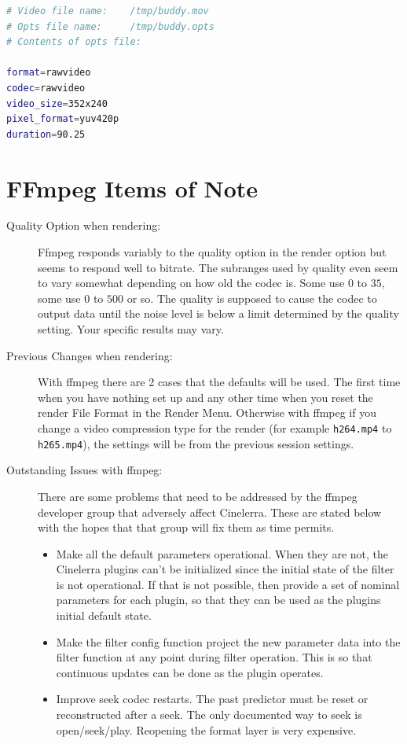 \begin{lstlisting}[language=bash]
# Video file name:    /tmp/buddy.mov
# Opts file name:     /tmp/buddy.opts
# Contents of opts file:

format=rawvideo
codec=rawvideo
video_size=352x240
pixel_format=yuv420p
duration=90.25
\end{lstlisting}

\section{FFmpeg Items of Note}%
\label{sec:ffmpeg_items_note}

\begin{description}
    \item[Quality Option when rendering:] Ffmpeg responds variably to the quality option in the render option but seems to respond well to bitrate. The subranges used by quality even seem to vary somewhat depending on how old the codec is. Some use $0$ to $35$, some use $0$ to $500$ or so.  The quality is supposed to cause the codec to output data until the noise level is below a limit determined by the quality setting. Your specific results may vary.
    \item[Previous Changes when rendering:] With ffmpeg there are 2 cases that the defaults will be used.  The first time when you have nothing set up and any other time when you reset the render File Format in the Render Menu.  Otherwise with ffmpeg if you change a video compression type for the render (for example \texttt{h264.mp4} to \texttt{h265.mp4}), the settings will be from the previous session settings.
    \item[Outstanding Issues with ffmpeg:] There are some problems that need to be addressed by the ffmpeg developer group that adversely affect Cinelerra.  These are stated below with the hopes that that group will fix them as time permits.
    \begin{itemize}
        \item Make all the default parameters operational.  When they are not, the Cinelerra plugins can't be initialized since the initial state of the filter is not operational.  If that is not possible, then provide a set of nominal parameters for each plugin, so that they can be used as the plugins initial default state.
        \item Make the filter config function project the new parameter data into the filter function at any point
        during filter operation.  This is so that continuous updates can be done as the plugin operates.
        \item Improve seek codec restarts.  The past predictor must be reset or reconstructed after a seek.  The  only documented way to seek is open/seek/play.  Reopening the format layer is very expensive.
    \end{itemize}
\end{description}
